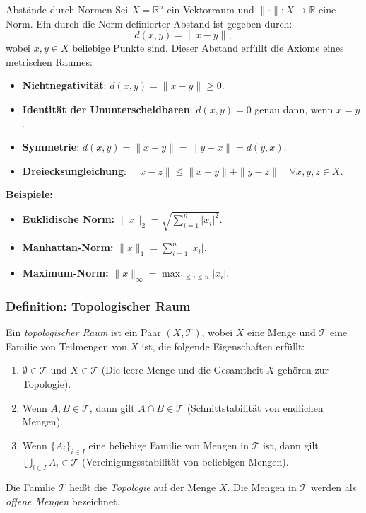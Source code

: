 \documentclass{beamer}
\begin{document}
  \begin{frame}{Abstände durch Normen}
    Sei \( X = \mathbb{R}^n \)  ein Vektorraum und \( \| \cdot \| : X \rightarrow \mathbb{R} \) eine Norm. Ein durch die Norm definierter Abstand ist gegeben durch:
    \[
    d(x, y) = \| x - y \|,
    \]
    wobei \( x, y \in X \) beliebige Punkte sind. Dieser Abstand erfüllt die Axiome eines metrischen Raumes:
    \begin{itemize}
      \item \textbf{Nichtnegativität}: \( d(x, y) = \| x - y \| \geq 0 \).
      \item \textbf{Identität der Ununterscheidbaren}: \( d(x, y) = 0 \) genau dann, wenn \( x = y \).
      \item \textbf{Symmetrie}: \( d(x, y) = \| x - y \| = \| y - x \| = d(y, x) \).
      \item \textbf{Dreiecksungleichung}: \( \| x - z \| \leq \| x - y \| + \| y - z \| \quad \forall x, y, z \in X \).
    \end{itemize}
    \textbf{Beispiele:}
    \begin{itemize}
      \item \textbf{Euklidische Norm:} \( \| x \|_2 = \sqrt{\sum_{i=1}^{n} |x_i|^2} \).
      \item \textbf{Manhattan-Norm:} \( \| x \|_1 = \sum_{i=1}^{n} |x_i| \).
      \item \textbf{Maximum-Norm:} \( \| x \|_\infty = \max_{1 \leq i \leq n} |x_i| \).
    \end{itemize}
  \end{frame}


  \begin{frame}
    \frametitle{Definition: Topologischer Raum}
    Ein \emph{topologischer Raum} ist ein Paar $(X, \mathcal{T})$, wobei $X$ eine Menge und $\mathcal{T}$ eine Familie von Teilmengen von $X$ ist, die folgende Eigenschaften erfüllt:
    \begin{enumerate}
        \item $\emptyset \in \mathcal{T}$ und $X \in \mathcal{T}$ (Die leere Menge und die Gesamtheit $X$ gehören zur Topologie).
        \item Wenn $A, B \in \mathcal{T}$, dann gilt $A \cap B \in \mathcal{T}$ (Schnittstabilität von endlichen Mengen).
        \item Wenn $\{A_i\}_{i \in I}$ eine beliebige Familie von Mengen in $\mathcal{T}$ ist, dann gilt $\bigcup_{i \in I} A_i \in \mathcal{T}$ (Vereinigungsstabilität von beliebigen Mengen).
    \end{enumerate}
    Die Familie $\mathcal{T}$ heißt die \emph{Topologie} auf der Menge $X$. Die Mengen in $\mathcal{T}$ werden als \emph{offene Mengen} bezeichnet.
\end{frame}
\end{document}
